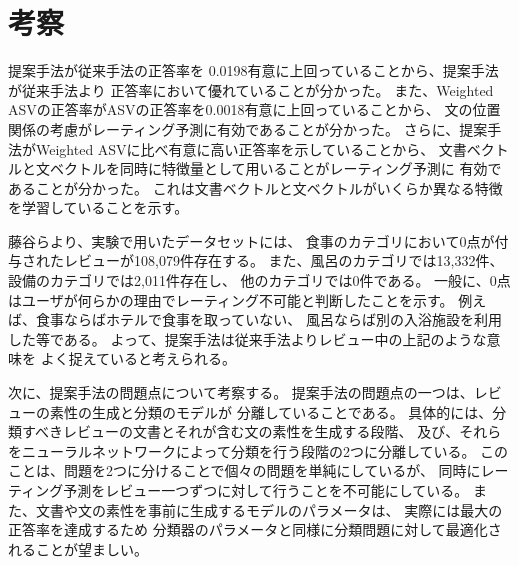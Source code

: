 \section{考察}

提案手法が従来手法\cite{fujitani15}の正答率を
0.0198有意に上回っていることから、提案手法が従来手法\cite{fujitani15}より
正答率において優れていることが分かった。
また、Weighted ASVの正答率がASVの正答率を0.0018有意に上回っていることから、
文の位置関係の考慮がレーティング予測に有効であることが分かった。
さらに、提案手法がWeighted ASVに比べ有意に高い正答率を示していることから、
文書ベクトルと文ベクトルを同時に特徴量として用いることがレーティング予測に
有効であることが分かった。
これは文書ベクトルと文ベクトルがいくらか異なる特徴を学習していることを示す。

藤谷ら\cite{fujitani15}より、実験で用いたデータセットには、
食事のカテゴリにおいて0点が付与されたレビューが108,079件存在する。
また、風呂のカテゴリでは13,332件、設備のカテゴリでは2,011件存在し、
他のカテゴリでは0件である。
一般に、0点はユーザが何らかの理由でレーティング不可能と判断したことを示す。
例えば、食事ならばホテルで食事を取っていない、
風呂ならば別の入浴施設を利用した等である。
よって、提案手法は従来手法\cite{fujitani15}よりレビュー中の上記のような意味を
よく捉えていると考えられる。

次に、提案手法の問題点について考察する。
提案手法の問題点の一つは、レビューの素性の生成と分類のモデルが
分離していることである。
具体的には、分類すべきレビューの文書とそれが含む文の素性を生成する段階、
及び、それらをニューラルネットワークによって分類を行う段階の2つに分離している。
このことは、問題を2つに分けることで個々の問題を単純にしているが、
同時にレーティング予測をレビュー一つずつに対して行うことを不可能にしている。
また、文書や文の素性を事前に生成するモデルのパラメータは、
実際には最大の正答率を達成するため
分類器のパラメータと同様に分類問題に対して最適化されることが望ましい。

